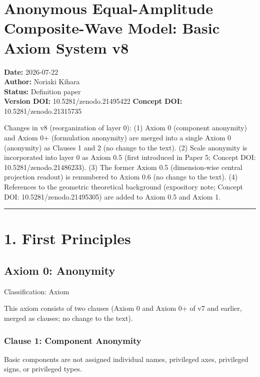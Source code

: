 \documentclass[
  a4paper,
]{article}
\author{}
\date{}
\begin{document}
\section{Anonymous Equal-Amplitude Composite-Wave Model: Basic Axiom
System
v8}\label{anonymous-equal-amplitude-composite-wave-model-basic-axiom-system-v8}

\textbf{Date:} 2026-07-22\\
\textbf{Author:} Noriaki Kihara\\
\textbf{Status:} Definition paper\\
\textbf{Version DOI:} 10.5281/zenodo.21495422 \textbf{Concept DOI:}
10.5281/zenodo.21315735

Changes in v8 (reorganization of layer 0): (1) Axiom 0 (component
anonymity) and Axiom 0+ (formulation anonymity) are merged into a single
Axiom 0 (anonymity) as Clauses 1 and 2 (no change to the text). (2)
Scale anonymity is incorporated into layer 0 as Axiom 0.5 (first
introduced in Paper 5; Concept DOI: 10.5281/zenodo.21486233). (3) The
former Axiom 0.5 (dimension-wise central projection readout) is
renumbered to Axiom 0.6 (no change to the text). (4) References to the
geometric theoretical background (expository note; Concept DOI:
10.5281/zenodo.21495305) are added to Axiom 0.5 and Axiom 1.

\begin{center}\rule{0.5\linewidth}{0.5pt}\end{center}

\section{1. First Principles}\label{first-principles}

\subsection{Axiom 0: Anonymity}\label{axiom-0-anonymity}

Classification: Axiom

This axiom consists of two clauses (Axiom 0 and Axiom 0+ of v7 and
earlier, merged as clauses; no change to the text).

\subsubsection{Clause 1: Component
Anonymity}\label{clause-1-component-anonymity}

Basic components are not assigned individual names, privileged axes,
privileged signs, or privileged types.
\end{document}
